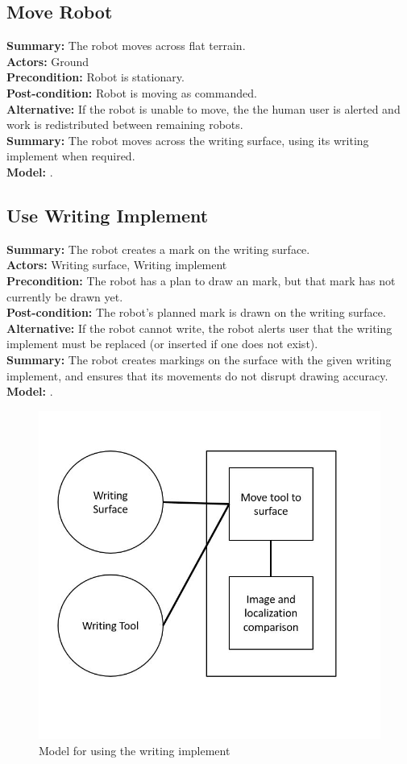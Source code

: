 \subsection{Move Robot}
\textbf{Summary:} The robot moves across flat terrain. \\
\textbf{Actors:} Ground \\
\textbf{Precondition:} Robot is stationary. \\
\textbf{Post-condition:} Robot is moving as commanded. \\
\textbf{Alternative:} If the robot is unable to move, the the human user is alerted and work is redistributed between remaining robots. \\
\textbf{Summary:} The robot moves across the writing surface, using its writing implement when required. \\
\textbf{Model:} .\\

\subsection{Use Writing Implement}
\textbf{Summary:} The robot creates a mark on the writing surface. \\
\textbf{Actors:} Writing surface, Writing implement \\
\textbf{Precondition:} The robot has a plan to draw an mark, but that mark has not currently be drawn yet. \\
\textbf{Post-condition:} The robot's planned mark is drawn on the writing surface. \\
\textbf{Alternative:} If the robot cannot write, the robot alerts user that the writing implement must be replaced (or inserted if one does not exist). \\
\textbf{Summary:} The robot creates markings on the surface with the given writing implement, and ensures that its movements do not disrupt drawing accuracy. \\
\textbf{Model:} .\\

\begin{figure}
 \centering
  \includegraphics[width=0.48\columnwidth]{figs/use_case-use_writing_implement.jpg}
	 \caption{Model for using the writing implement}
 \label{fig:use_tool}
\end{figure}

